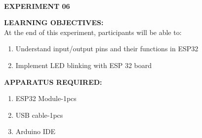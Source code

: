 \documentclass[12pt,a4paper]{article}
\begin{document}
\begin{center}

\textbf{\large \\EXPERIMENT 06 }\\[6pt]
\end{center}

\textbf{\large LEARNING OBJECTIVES:}\\[3pt]
At the end of this experiment, participants will be able to:\vspace{-6mm}\begin{enumerate}
 \setlength\itemsep{-0.3em}
\item Understand input/output pins and their functions in ESP32 \\
\item Implement LED blinking with ESP 32 board 
\end{enumerate}
\textbf{\large APPARATUS REQUIRED:}\\
\vspace{-3mm}
\begin{enumerate}
 \setlength\itemsep{-0.3em}
\item ESP32 Module-1pcs \\
\item USB cable-1pcs\\
\item Arduino IDE
\end{enumerate}
\end{document}
